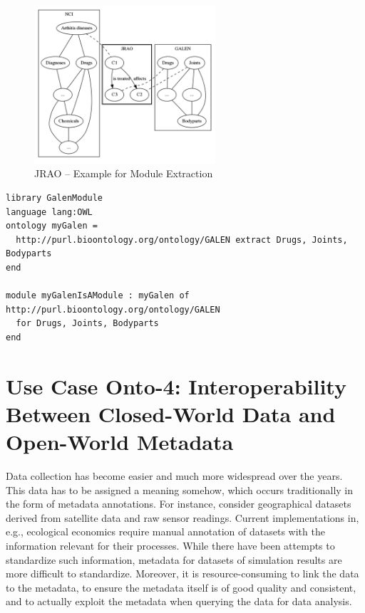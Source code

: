\documentclass[10pt,fleqn,final]{scrreprt}
\newenvironment{definitions}[0]{\medskip }{}
\begin{document}
\begin{definitions}
\begin{figure}[htbp]
\begin{center}
\includegraphics[width=0.6\textwidth]{useCaseOnto3.png}
\caption{JRAO  -- Example for Module Extraction}
\label{JRAO}
\end{center}
\end{figure}


\begin{lstlisting}[basicstyle=\ttfamily,language=dolText,morekeywords={props,ObjectProperty,Class,DisjointUnionOf,SubClassOf,Characteristics,Transitive,Asymmetric,SubPropertyOf,DisjointClasses,EquivalentTo,inverse,only,forall,iff,if,or,exists,distributed,extract},escapechar=@,mathescape]
%prefix( lang:  <http://purl.net/DOL/languages/> )%
library GalenModule
language lang:OWL
ontology myGalen = 
  http://purl.bioontology.org/ontology/GALEN extract Drugs, Joints, Bodyparts
end

module myGalenIsAModule : myGalen of http://purl.bioontology.org/ontology/GALEN 
  for Drugs, Joints, Bodyparts
end
\end{lstlisting}
 


\section{Use Case Onto-4: Interoperability Between Closed-World Data and Open-World Metadata}
Data collection has become easier and much more widespread over the years. This data has to be 
assigned a meaning somehow, which occurs traditionally in the  form of metadata annotations. For 
instance, consider geographical datasets derived from satellite data and raw sensor readings. 
Current implementations in, e.g., ecological economics\cite{bagstad_aries_2011} require manual 
annotation of datasets with the information relevant for their processes. While there have been 
attempts to standardize such information\cite{european_comission_inspire_2014}, metadata for 
datasets of simulation results are more difficult to standardize. Moreover, it is 
resource-consuming to link the data to the metadata, to ensure the metadata itself is of good 
quality and consistent, and to actually exploit the metadata when querying the data for data 
analysis. 


\end{definitions}
\end{document}
